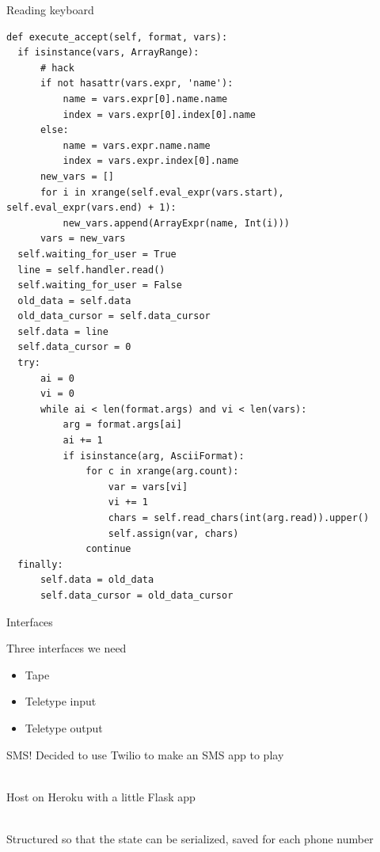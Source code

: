 \documentclass{beamer}
\def\py{
  \lstset{
     language=Python,
     extendedchars=true,
     basicstyle=\footnotesize\ttfamily,
     showstringspaces=false,
     showspaces=false,
     numbersep=9pt,
     tabsize=2,
     breaklines=true,
     showtabs=false,
     captionpos=b
  }
}
\begin{document}
\begin{frame}[fragile]{Reading keyboard}
\py
\begin{lstlisting}
def execute_accept(self, format, vars):
  if isinstance(vars, ArrayRange):
      # hack
      if not hasattr(vars.expr, 'name'):
          name = vars.expr[0].name.name
          index = vars.expr[0].index[0].name
      else:
          name = vars.expr.name.name
          index = vars.expr.index[0].name
      new_vars = []
      for i in xrange(self.eval_expr(vars.start), self.eval_expr(vars.end) + 1):
          new_vars.append(ArrayExpr(name, Int(i)))
      vars = new_vars
  self.waiting_for_user = True
  line = self.handler.read()
  self.waiting_for_user = False
  old_data = self.data
  old_data_cursor = self.data_cursor
  self.data = line
  self.data_cursor = 0
  try:
      ai = 0
      vi = 0
      while ai < len(format.args) and vi < len(vars):
          arg = format.args[ai]
          ai += 1
          if isinstance(arg, AsciiFormat):
              for c in xrange(arg.count):
                  var = vars[vi]
                  vi += 1
                  chars = self.read_chars(int(arg.read)).upper()
                  self.assign(var, chars)
              continue
  finally:
      self.data = old_data
      self.data_cursor = old_data_cursor
\end{lstlisting}
\end{frame}

\begin{frame}{Interfaces}

Three interfaces we need

\begin{itemize}
  \item Tape
  \item Teletype input
  \item Teletype output
\end{itemize}
\end{frame}
\begin{frame}{SMS!}
Decided to use Twilio to make an SMS app to play

\ \\

Host on Heroku with a little Flask app

\ \\

Structured so that the state can be serialized, saved for each phone number
\end{frame}
\end{document}
